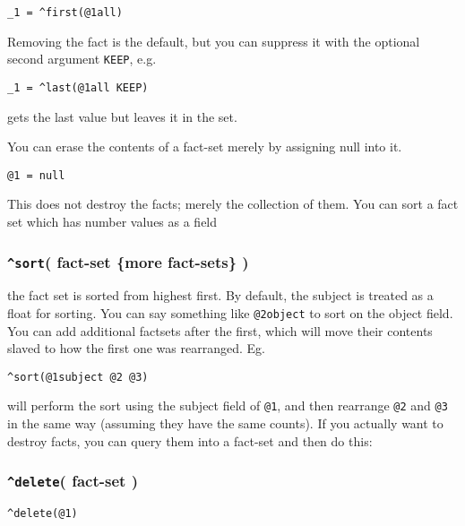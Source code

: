 \documentclass[]{article}
\begin{document}
\begin{verbatim}
_1 = ^first(@1all)
\end{verbatim}

Removing the fact is the default, but you can suppress it with the
optional second argument \texttt{KEEP}, e.g.

\begin{verbatim}
_1 = ^last(@1all KEEP) 
\end{verbatim}

gets the last value but leaves it in the set.

You can erase the contents of a fact-set merely by assigning null into
it.

\begin{verbatim}
@1 = null
\end{verbatim}

This does not destroy the facts; merely the collection of them. You can
sort a fact set which has number values as a field

\subsubsection{\texorpdfstring{\texttt{\^{}sort}( fact-set \{more
fact-sets\}
)}{\^{}sort( fact-set \{more fact-sets\} )}}\label{sort-fact-set-more-fact-sets}

the fact set is sorted from highest first. By default, the subject is
treated as a float for sorting. You can say something like
\texttt{@2object} to sort on the object field. You can add additional
factsets after the first, which will move their contents slaved to how
the first one was rearranged. Eg.

\begin{verbatim}
^sort(@1subject @2 @3)
\end{verbatim}

will perform the sort using the subject field of \texttt{@1}, and then
rearrange \texttt{@2} and \texttt{@3} in the same way (assuming they
have the same counts). If you actually want to destroy facts, you can
query them into a fact-set and then do this:

\subsubsection{\texorpdfstring{\texttt{\^{}delete}( fact-set
)}{\^{}delete( fact-set )}}\label{delete-fact-set}

\begin{verbatim}
^delete(@1)
\end{verbatim}
\end{document}
